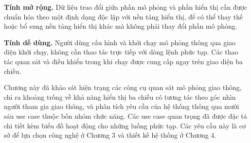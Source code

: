 ﻿\documentclass[../DoAn.tex]{subfiles}
\begin{document}
\textbf{Tính mở rộng.} Dữ liệu trao đổi giữa phần mô phỏng và phần hiển thị cần
được chuẩn hóa theo một định dạng độc lập với nền tảng hiển thị, để có thể thay
thế hoặc bổ sung nền tảng hiển thị khác mà không phải thay đổi phần mô phỏng.

\textbf{Tính dễ dùng.} Người dùng cấu hình và khởi chạy mô phỏng thông qua
giao diện khởi chạy, không cần thao tác trực tiếp với dòng lệnh phức tạp. Các
thao tác quan sát và điều khiển trong khi chạy được cung cấp ngay trên giao diện
ba chiều.

Chương này đã khảo sát hiện trạng các công cụ quan sát mô phỏng giao thông, chỉ
ra khoảng trống về khả năng hiển thị ba chiều có tương tác theo góc nhìn người
tham gia giao thông, và phân tích yêu cầu của hệ thống thông qua mười sáu use case
thuộc bốn nhóm chức năng. Các use case quan trọng đã được đặc tả chi tiết kèm
biểu đồ hoạt động cho những luồng phức tạp. Các yêu cầu này là cơ sở để lựa chọn
công nghệ ở Chương 3 và thiết kế hệ thống ở Chương 4.
\end{document}

